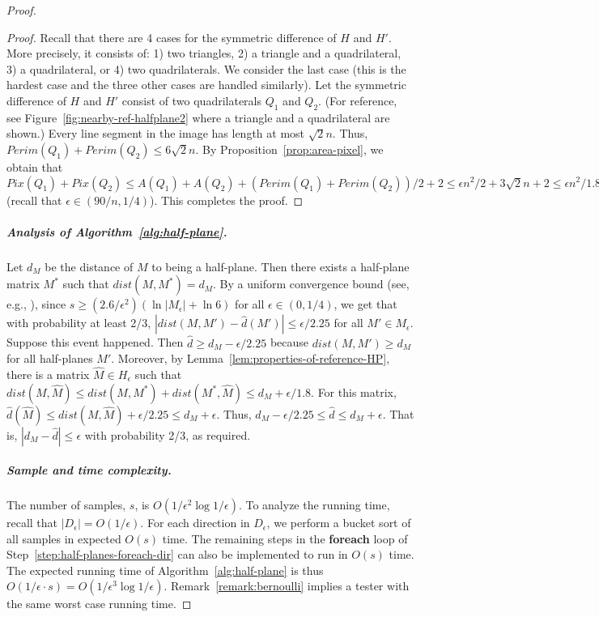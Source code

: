\documentclass[11pt,english]{article}
\numberwithin{figure}{section}
\newcommand{\eps}{{\epsilon}}
\newcommand{\dis}{dist}
\newcommand{\mydelta}{\epsilon} \newcommand{\bigdelta}{{\epsilon_0}} \newcommand{\dsquares}{d_{\rm squares}}
\newcommand{\dout}{\hat{d}}
\begin{document}
\begin{proof}
{\begin{proof}
Recall that there are 4 cases for the symmetric difference of $H$ and $H'$. More precisely, it consists of: 1) two triangles, 2) a triangle and a quadrilateral, 3) a quadrilateral, or 4) two quadrilaterals. We consider the last case (this is the hardest case and the three other cases are handled similarly). Let the symmetric difference of $H$ and $H'$ consist of two quadrilaterals $Q_1$ and $Q_2$. (For reference, see Figure~\ref{fig:nearby-ref-halfplane2} where a triangle and a quadrilateral are shown.) Every line segment in the image has length at most $\sqrt{2}n$. Thus, $Perim(Q_1)+Perim(Q_2)\leq 6\sqrt{2}n$. By Proposition~\ref{prop:area-pixel}, we obtain that $Pix(Q_1)+Pix(Q_2)\leq A(Q_1)+A(Q_2)+(Perim(Q_1)+Perim(Q_2))/2+2\leq \eps n^2/2+3\sqrt{2}n+2\leq\eps n^2/1.8$ (recall that $\eps\in(90/n,1/4)$). This completes the proof.
\end{proof}
}
\subparagraph{Analysis of Algorithm~\ref{alg:half-plane}.}
Let $d_M$ be the distance of $M$ to being a half-plane. Then there exists a half-plane matrix $M^{*}$ such that $\dis(M,M^{*})=d_M$.
By a uniform convergence bound (see, e.g., \cite{Avrim-lecture-notes}), since $s\geq (2.6/\mydelta^2)(\ln |M_\mydelta| + \ln 6)$ for all $\mydelta\in(0,1/4)$, we get that with probability at least 2/3,
$|\dis(M,M')-\dout(M')|\leq \mydelta/2.25$ for all $M'\in M_\mydelta$. Suppose this event happened. Then $\dout\geq d_M-\mydelta/2.25$ because $\dis(M,M')\geq d_M$ for all half-planes $M'$. Moreover, by Lemma~\ref{lem:properties-of-reference-HP}, there is a matrix $\hat{M}\in H_{\mydelta}$
such that $\dis(M,\hat{M})\leq\dis(M,M^*)+\dis(M^*,\hat{M})
\leq d_M+\mydelta/1.8$. For this matrix, $\dout(\hat{M})\leq\dis(M,\hat{M})+\mydelta/2.25\leq d_M+\mydelta.$ Thus,
$d_M-\mydelta/2.25\leq\dout\leq d_M+\mydelta.$ That is, $|d_M-\dout|\leq \mydelta$ with probability 2/3, as required.


\subparagraph{Sample and time complexity.} The number of samples, $s$, is $O(1/\mydelta^2 \log 1/\mydelta)$. To analyze the running time, recall that $|D_\mydelta|=O(1/\mydelta)$. For each direction in $D_\mydelta$, we perform a bucket sort of all samples in expected $O(s)$ time. The remaining steps in the {\bf foreach} loop of Step~\ref{step:half-planes-foreach-dir} can also be implemented to run in $O(s)$ time. The expected running time of Algorithm~\ref{alg:half-plane} is thus $O(1/\mydelta \cdot s)=O(1/\mydelta^3\log 1/\mydelta)$.
Remark~\ref{remark:bernoulli} implies a tester with the same worst case running time.
\end{proof}
\end{document}
